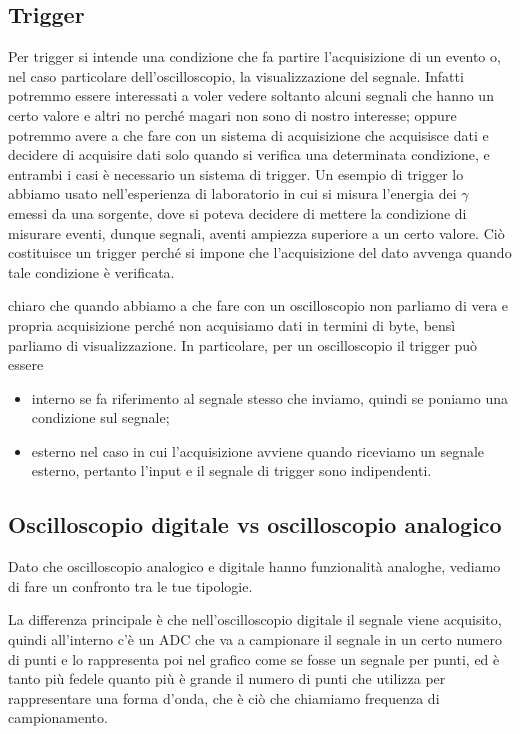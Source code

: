 \subsection{Trigger}
Per trigger si intende una condizione che fa partire l'acquisizione di un evento o, nel caso particolare dell'oscilloscopio, la visualizzazione del segnale. Infatti potremmo essere interessati a voler vedere soltanto alcuni segnali che hanno un certo valore e altri no perché magari non sono di nostro interesse; oppure potremmo avere a che fare con un sistema di acquisizione che acquisisce dati e decidere di acquisire dati solo quando si verifica una determinata condizione, e entrambi i casi è necessario un sistema di trigger. Un esempio di trigger lo abbiamo usato nell'esperienza di laboratorio in cui si misura l'energia dei $\gamma$ emessi da una sorgente, dove si poteva decidere di mettere la condizione di misurare eventi, dunque segnali, aventi ampiezza superiore a un certo valore. Ciò costituisce un trigger perché si impone che l'acquisizione del dato avvenga quando tale condizione è verificata.

\E chiaro che quando abbiamo a che fare con un oscilloscopio non parliamo di vera e propria acquisizione perché non acquisiamo dati in termini di byte, bensì parliamo di visualizzazione. In particolare, per un oscilloscopio il trigger può essere

\begin{itemize}[leftmargin=0.5cm]
   \item interno se fa riferimento al segnale stesso che inviamo, quindi se poniamo una condizione sul segnale;
   \item esterno nel caso in cui l'acquisizione avviene quando riceviamo un segnale esterno, pertanto l'input e il segnale di trigger sono indipendenti.
\end{itemize}

\subsection{Oscilloscopio digitale vs oscilloscopio analogico}
Dato che oscilloscopio analogico e digitale hanno funzionalità analoghe, vediamo di fare un confronto tra le tue tipologie. 

La differenza principale è che nell'oscilloscopio digitale il segnale viene acquisito, quindi all'interno c'è un ADC che va a campionare il segnale in un certo numero di punti e lo rappresenta poi nel grafico come se fosse un segnale per punti, ed è tanto più fedele quanto più è grande il numero di punti che utilizza per rappresentare una forma d'onda, che è ciò che chiamiamo frequenza di campionamento.

